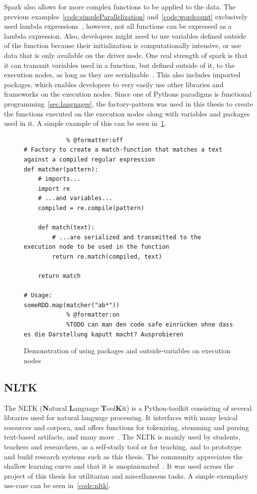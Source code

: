 Spark also allows for more complex functions to be applied to the data.
The previous examples~\ref{code:simpleParallelization} and~\ref{code:wordcount} exclusively used lambda expressions~\cite{pythonDocs},
however, not all functions can be expressed as a lambda expression.
Also, developers might need to use variables defined outside of the function because their initialization is computationally intensive,
or use data that is only available on the driver node.
One real strength of spark is that it can transmit variables used in a function, but defined outside of it, to the execution nodes, as long as they are serializable~\cite{sparkDocs}.
This also includes imported packages, which enables developers to very easily use other libraries and frameworks on the execution nodes.
Since one of Pythons paradigms is functional programming~\ref{sec:languages},
the factory-pattern was used in this thesis to create the functions executed on the execution nodes along with variables and packages used in it.
A simple example of this can be seen in~\ref{code:factory}.

\begin{figure}
    \caption{Demonstration of using packages and outside-variables on execution nodes}
    \label{code:factory}
        \begin{verbatim}
            % @formatter:off
# Factory to create a match-function that matches a text against a compiled regular expression
def matcher(pattern):
    # imports...
    import re
    # ...and variables...
    compiled = re.compile(pattern)

    def match(text):
        # ...are serialized and transmitted to the execution node to be used in the function
        return re.match(compiled, text)

    return match

# Usage:
someRDD.map(matcher("ab*"))
            % @formatter:on
            %TODO can man den code safe einrücken ohne dass es die Darstellung kaputt macht? Ausprobieren
        \end{verbatim}
\end{figure}

\subsection{NLTK}
\label{subsec:nltk}

The NLTK (\textbf{N}atural \textbf{L}anguage \textbf{T}ool\textbf{K}it) is a Python-toolkit consisting of several libraries used for
natural language processing.
It interfaces with many lexical resources and corpora, and offers functions for tokenizing, stemming and parsing text-based artifacts,
and many more~\cite{nltkDocs}.
The NLTK is mainly used by students, teachers and researchers, as a self-study tool or for teaching,
and to prototype and build research systems such as this thesis.
The community appreciates the shallow learning curve and that it is unopinionated~\cite{Bird2006}.
It was used across the project of this thesis for utilitarian and miscellaneous tasks.
A simple exemplary use-case can be seen in~\ref{code:nltk}.

